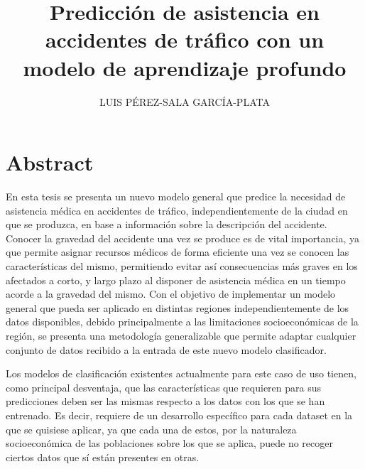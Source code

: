 \documentclass{uathesis-es}
\title{Predicción de asistencia en accidentes de tráfico con un modelo de aprendizaje profundo}
\author{LUIS PÉREZ-SALA GARCÍA-PLATA}
\begin{document}
\maketitle

\tableofcontents



\chapter*{Abstract}





En esta tesis se presenta un nuevo modelo general que predice la necesidad de asistencia médica en accidentes de tráfico, independientemente de la ciudad en que se produzca, en base a información sobre la descripción del accidente. Conocer la gravedad del accidente una vez se produce es de vital importancia, ya que permite asignar recursos médicos de forma eficiente una vez se conocen las características del mismo, permitiendo evitar así consecuencias más graves en los afectados a corto, y largo plazo al disponer de asistencia médica en un tiempo acorde a la gravedad del mismo. Con el objetivo de implementar un modelo general que pueda ser aplicado en distintas regiones independientemente de los datos disponibles, debido principalmente a las limitaciones socioeconómicas de la región, se presenta una metodología generalizable que permite adaptar cualquier conjunto de datos recibido a la entrada de este nuevo modelo clasificador.

Los modelos de clasificación existentes actualmente para este caso de uso tienen, como principal desventaja, que las características que requieren para sus predicciones deben ser las mismas respecto a los datos con los que se han entrenado. 
Es decir, requiere de un desarrollo específico para cada dataset en la que se quisiese aplicar, ya que cada una de estos, por la naturaleza socioeconómica de las poblaciones sobre los que se aplica, puede no recoger ciertos datos que sí están presentes en otras. 
\end{document}
